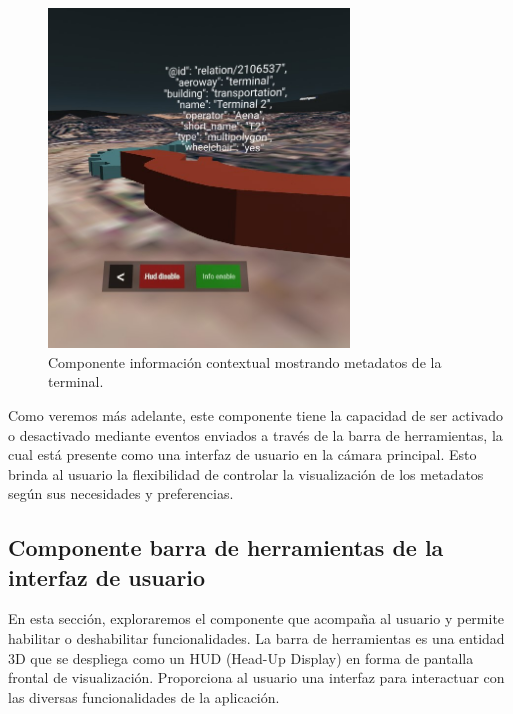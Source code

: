 \documentclass[a4paper, 11pt]{book}
\begin{document}
\begin{figure}[h]
  \centering
  \includegraphics[width=8cm, keepaspectratio]{img/tooltip.jpg}
  \caption{Componente información contextual mostrando metadatos de la terminal.}
  \label{fig:tooltip}
\end{figure}
Como veremos más adelante, este componente tiene la capacidad de ser activado o desactivado mediante eventos enviados a través de la barra de herramientas, la cual está presente como una interfaz de usuario en la cámara principal. Esto brinda al usuario la flexibilidad de controlar la visualización de los metadatos según sus necesidades y preferencias.

\subsection{Componente barra de herramientas de la interfaz de usuario}
\label{subsec:toolbar3d}
En esta sección, exploraremos el componente que acompaña al usuario y permite habilitar o deshabilitar funcionalidades. La barra de herramientas es una entidad 3D que se despliega como un HUD (Head-Up Display) en forma de pantalla frontal de visualización. Proporciona al usuario una interfaz para interactuar con las diversas funcionalidades de la aplicación.
\end{document}

